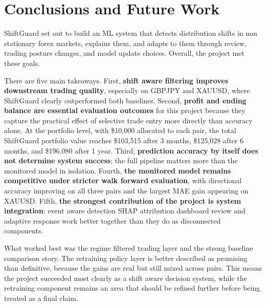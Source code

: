 \documentclass[11pt]{article}
\begin{document}
\section{Conclusions and Future Work}
ShiftGuard set out to build an ML system that detects distribution shifts in non stationary forex markets, explains them, and adapts to them through review, trading posture changes, and model update choices. Overall, the project met these goals.

There are five main takeaways. First, \textbf{shift aware filtering improves downstream trading quality}, especially on GBPJPY and XAUUSD, where ShiftGuard clearly outperformed both baselines. Second, \textbf{profit and ending balance are essential evaluation outcomes} for this project because they capture the practical effect of selective trade entry more directly than accuracy alone. At the portfolio level, with \$10{,}000 allocated to each pair, the total ShiftGuard portfolio value reaches \$103{,}515 after 3 months, \$125{,}028 after 6 months, and \$196{,}080 after 1 year. Third, \textbf{prediction accuracy by itself does not determine system success}; the full pipeline matters more than the monitored model in isolation. Fourth, \textbf{the monitored model remains competitive under stricter walk forward evaluation}, with directional accuracy improving on all three pairs and the largest MAE gain appearing on XAUUSD. Fifth, \textbf{the strongest contribution of the project is system integration}: event aware detection SHAP attribution dashboard review and adaptive response work better together than they do as disconnected components.

What worked best was the regime filtered trading layer and the strong baseline comparison story. The retraining policy layer is better described as promising than definitive, because the gains are real but still mixed across pairs. This means the project succeeded most clearly as a shift aware decision system, while the retraining component remains an area that should be refined further before being treated as a final claim.
\end{document}
